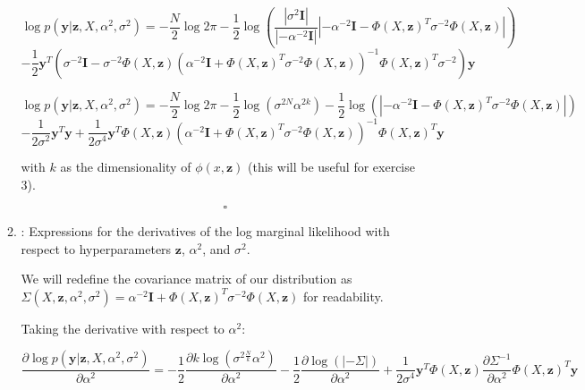 \documentclass[11pt]{article}
\newcommand{\ind}{\ensuremath{\mathbf{I}}}
\newcommand{\mbf}[1]{{\boldsymbol{\mathbf{#1}}}}
\renewcommand{\bm}{\mbf}
\begin{document}
\begin{enumerate}
\begin{enumerate}[label=(\alph*)]
            $$
            \log p(\bm{y}|\bm{z}, X, \alpha^2, \sigma^2) = - \dfrac{N}{2}\log 2\pi - \dfrac{1}{2} \log (\dfrac{|\sigma^2 \ind|}{|-\alpha^{-2}\ind|} |-\alpha^{-2} \ind - \Phi(X, \bm{z})^T \sigma^{-2} \Phi(X, \bm{z})|) $$$$- \dfrac{1}{2} \bm{y}^T(\sigma^{-2}\ind - \sigma^{-2} \Phi(X, \bm{z}) (\alpha^{-2} \ind + \Phi(X, \bm{z})^T \sigma^{-2} \Phi(X, \bm{z}))^{-1}\Phi(X, \bm{z})^T \sigma^{-2})\bm{y}
            $$

            $$
            \log p(\bm{y}|\bm{z}, X, \alpha^2, \sigma^2) = - \dfrac{N}{2}\log 2\pi - \dfrac{1}{2} \log (\sigma^{2N}\alpha^{2k}) - \dfrac{1}{2} \log(|-\alpha^{-2} \ind - \Phi(X, \bm{z})^T \sigma^{-2} \Phi(X, \bm{z})|) $$$$- \dfrac{1}{2 \sigma^{2}} \bm{y}^T \bm{y} + \dfrac{1}{2 \sigma^4} \bm{y}^T \Phi(X, \bm{z}) (\alpha^{-2} \ind + \Phi(X, \bm{z})^T \sigma^{-2} \Phi(X, \bm{z}))^{-1}\Phi(X, \bm{z})^T\bm{y}
            $$

            with $k$ as the dimensionality of $\phi(x, \bm{z})$ (this will be useful for exercise 3).



            $$\square$$

        \item: Expressions for the derivatives of the log marginal likelihood with respect to hyperparameters $\bm{z}$, $\alpha^2$, and $\sigma^2$.

            We will redefine the covariance matrix of our distribution as $\Sigma(X, \bm{z}, \alpha^2, \sigma^2) = \alpha^{-2} \ind + \Phi(X, \bm{z})^T \sigma^{-2} \Phi(X, \bm{z})$ for readability.

            Taking the derivative with respect to $\alpha^2$:

            $$
            \dfrac{\partial \log p(\bm{y}|\bm{z}, X, \alpha^2, \sigma^2)}{\partial \alpha^2} = - \dfrac{1}{2} \dfrac{\partial k \log (\sigma^{2\frac{N}{k}}\alpha^{2})}{\partial \alpha^2} - \dfrac{1}{2} \dfrac{\partial \log(|-\Sigma|)}{\partial \alpha^2} + \dfrac{1}{2 \sigma^4} \bm{y}^T \Phi(X, \bm{z}) \dfrac{\partial \Sigma^{-1}}{\partial \alpha^2} \Phi(X, \bm{z})^T\bm{y}
            $$


\end{enumerate}
\end{enumerate}
\end{document}
